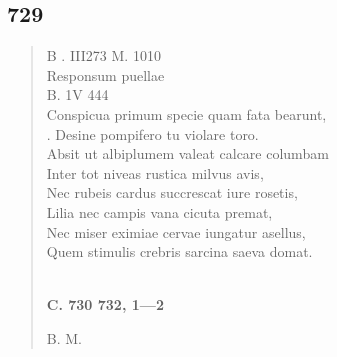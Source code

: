 \documentclass[11pt, a4paper]{report}
\begin{document}
            \subsection*{729}
      \begin{verse}
      B . III273 M. 1010 \\ Responsum puellae \\ B. 1V 444 \\ Conspicua primum specie quam fata bearunt, \\ . Desine pompifero tu violare toro. \\ Absit ut albiplumem valeat calcare columbam \\ Inter tot niveas rustica milvus avis, \\ Nec rubeis cardus succrescat iure rosetis, \\ Lilia nec campis vana cicuta premat, \\ Nec miser eximiae cervae iungatur asellus, \\ Quem stimulis crebris sarcina saeva domat. \\ 
        ﻿\pagebreak 
    \begin{center} \textbf{C. 730 732, 1—2} \end{center} \marginpar{[216]} B. M. \\ 
      \end{verse}
  
\end{document}
